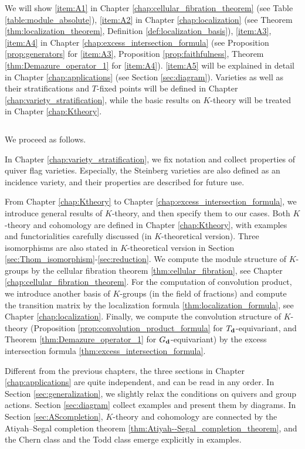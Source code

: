 We will show \eqref{item:A1} in Chapter \ref{chap:cellular_fibration_theorem} (see Table \ref{table:module_absolute}), \eqref{item:A2} in Chapter \ref{chap:localization} (see Theorem \ref{thm:localization_theorem}, Definition \ref{def:localization_basis}), \eqref{item:A3}, \eqref{item:A4} in Chapter \ref{chap:excess_intersection_formula} (see Proposition \ref{prop:generators} for \eqref{item:A3}, Proposition \ref{prop:faithfulness}, Theorem \ref{thm:Demazure_operator_1} for \eqref{item:A4}). \eqref{item:A5} will be explained in detail in Chapter \ref{chap:applications} (see Section \ref{sec:diagram}). Varieties as well as their stratifications and $T$-fixed points will be defined in Chapter \ref{chap:variety_stratification}, while the basic results on $K$-theory will be treated in Chapter \ref{chap:Ktheory}.

$\,$

We proceed as follows.

In Chapter \ref{chap:variety_stratification}, we fix notation and collect properties of quiver flag varieties. Especially, the Steinberg varieties are also defined as an incidence variety, and their properties are described for future use.

From Chapter \ref{chap:Ktheory} to Chapter \ref{chap:excess_intersection_formula}, we introduce general results of $K$-theory, and then specify them to our cases. Both $K$-theory and cohomology are defined in Chapter \ref{chap:Ktheory}, with examples and functorialities carefully discussed (in $K$-theoretical version). Three isomorphisms are also stated in $K$-theoretical version in Section \ref{sec:Thom_isomorphism}-\ref{sec:reduction}. We compute the module structure of $K$-groups by the cellular fibration theorem \ref{thm:cellular_fibration}, see Chapter \ref{chap:cellular_fibration_theorem}. For the computation of convolution product, we introduce another basis of $K$-groups (in the field of fractions) and compute the transition matrix by the localization formula \ref{thm:localization_formula}, see Chapter \ref{chap:localization}. Finally, we compute the convolution structure of $K$-theory (Proposition \ref{prop:convolution_product_formula} for $T_{\mathbf{d}}$-equivariant, and Theorem \ref{thm:Demazure_operator_1} for $G_{\mathbf{d}}$-equivariant) by the excess intersection formula \ref{thm:excess_intersection_formula}.

Different from the previous chapters, the three sections in Chapter \ref{chap:applications} are quite independent, and can be read in any order. In Section \ref{sec:generalization}, we slightly relax the conditions on quivers and group actions. Section \ref{sec:diagram} collect examples and present them by diagrams. In Section \ref{sec:AScompletion}, $K$-theory and cohomology are connected by the Atiyah--Segal completion theorem \ref{thm:Atiyah--Segal_completion_theorem}, and the Chern class and the Todd class emerge explicitly in examples.


